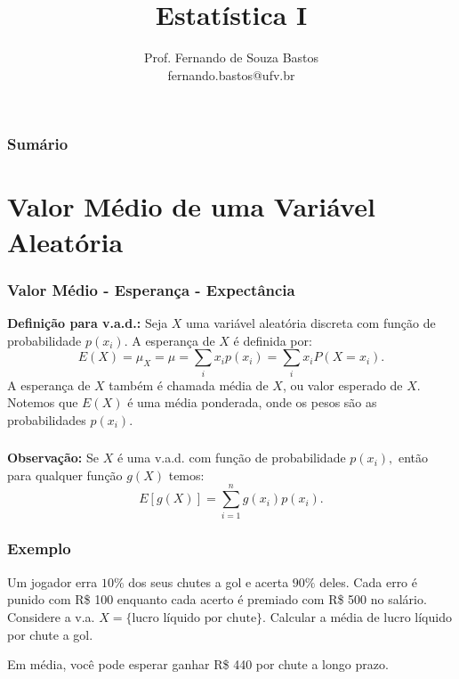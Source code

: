 \documentclass[14pt,aspectratio=1610]{beamer}
\title{Estatística I}
\author{Prof. Fernando de Souza Bastos \texorpdfstring{\\ fernando.bastos@ufv.br}{}}
\institute{Departamento de Estatística \texorpdfstring{\\ Universidade Federal de Viçosa}{}\texorpdfstring{\\ Campus UFV - Viçosa}{}}
\date{}
\begin{document}
%

\frame{\titlepage}

\begin{frame}{}
\frametitle{\bf Sumário}
\tableofcontents
\end{frame}

\section{Valor Médio de uma Variável Aleatória}
\begin{frame}{}
\frametitle{Valor Médio - Esperança - Expectância}
\begin{block}{}
\justifying
\textbf{Definição para v.a.d.:} Seja $X$ uma variável aleatória discreta com função de probabilidade $p(x_{i})$. A esperança de $X$ é definida por: 
$$\displaystyle E(X)=\mu_{X}=\mu=\sum_{i}x_{i}p(x_{i})=\sum_{i}x_{i}P(X=x_{i}).$$ A esperança de $X$ também é chamada média de $X$, ou valor esperado de $X$. 
Notemos que $E(X)$ é uma média ponderada, onde os pesos são as probabilidades $p(x_{i}).$
\end{block}
\end{frame}

\begin{frame}{}
\frametitle{}
\begin{block}{}
\justifying
\textbf{Observação:} Se $X$ é uma v.a.d. com função de probabilidade $p(x_{i}),$ então para qualquer função $g(X)$ temos: 
$$\displaystyle E[g(X)]=\sum_{i=1}^{n}g(x_{i})p(x_{i}).$$
\end{block}
\end{frame}

\begin{frame}{}
\frametitle{Exemplo}
\begin{block}{}
\justifying
Um jogador erra $10\%$ dos seus chutes a gol e acerta $90\%$ deles. Cada erro é punido com R\$ 100 enquanto cada acerto é premiado com R\$ 500 no salário. Considere a v.a. $X=\{\textrm{lucro líquido por chute}\}.$ Calcular a média de lucro líquido por chute a gol.
\end{block}
\pause
\begin{block}{}
\justifying
Em média, você pode esperar ganhar R\$ 440 por chute a longo prazo.
\end{block}
\end{frame}
\end{document}
